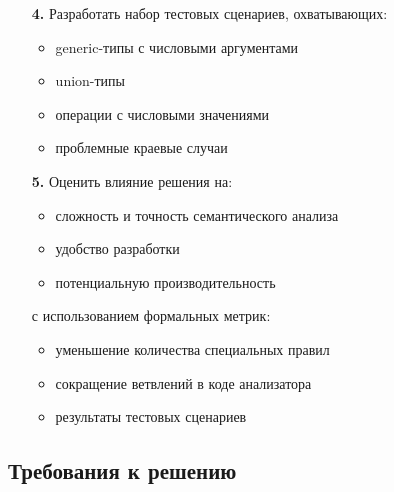 \begin{enumerate}[leftmargin=*,align=left]
    \item[\textbf{4.}] Разработать набор тестовых сценариев, охватывающих:
    \begin{itemize}
        \item generic-типы с числовыми аргументами
        \item union-типы
        \item операции с числовыми значениями
        \item проблемные краевые случаи
    \end{itemize}

    \item[\textbf{5.}] Оценить влияние решения на:
    \begin{itemize}
        \item сложность и точность семантического анализа
        \item удобство разработки
        \item потенциальную производительность
    \end{itemize}
    с использованием формальных метрик:
    \begin{itemize}
        \item уменьшение количества специальных правил
        \item сокращение ветвлений в коде анализатора
        \item результаты тестовых сценариев
    \end{itemize}
\end{enumerate}

\subsection{Требования к решению}
